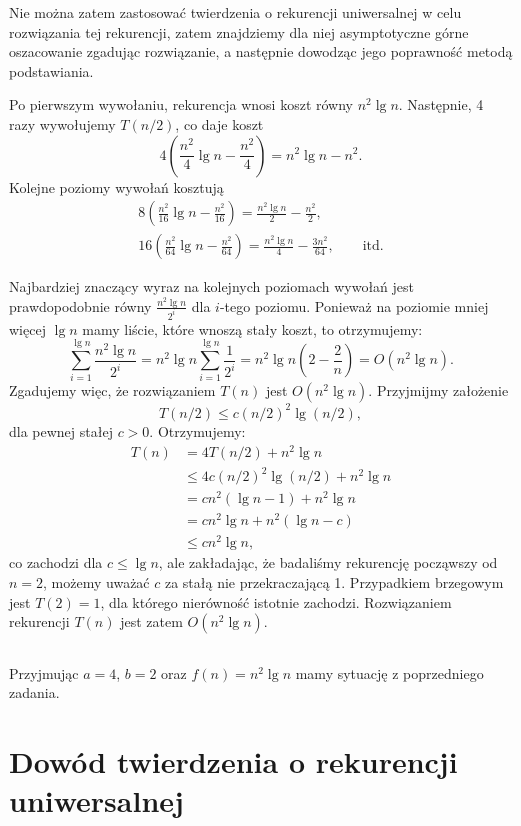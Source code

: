 Nie można zatem zastosować twierdzenia o rekurencji uniwersalnej w celu rozwiązania tej rekurencji, zatem znajdziemy dla niej asymptotyczne górne oszacowanie zgadując rozwiązanie, a następnie dowodząc jego poprawność metodą podstawiania.

Po pierwszym wywołaniu, rekurencja wnosi koszt równy $n^2\lg n$. Następnie, 4 razy wywołujemy $T(n/2)$, co daje koszt
\[
	4\left(\frac{n^2}{4}\lg n-\frac{n^2}{4}\right) = n^2\lg n-n^2.
\]
Kolejne poziomy wywołań kosztują
\begin{gather*}
	8\left(\frac{n^2}{16}\lg n-\frac{n^2}{16}\right) = \frac{n^2\lg n}{2}-\frac{n^2}{2}, \\
	16\left(\frac{n^2}{64}\lg n-\frac{n^2}{64}\right) = \frac{n^2\lg n}{4}-\frac{3n^2}{64},\qquad\text{itd.}
\end{gather*}

Najbardziej znaczący wyraz na kolejnych poziomach wywołań jest prawdopodobnie równy $\frac{n^2\lg n}{2^i}$ dla $i$-tego poziomu. Ponieważ na poziomie mniej więcej $\lg n$ mamy liście, które wnoszą stały koszt, to otrzymujemy:
\[
	\sum_{i=1}^{\lg n}\frac{n^2\lg n}{2^i} = n^2\lg n\sum_{i=1}^{\lg n}\frac{1}{2^i} = n^2\lg n\left(2-\frac{2}{n}\right) = O(n^2\lg n).
\]
Zgadujemy więc, że rozwiązaniem $T(n)$ jest $O(n^2\lg n)$. Przyjmijmy założenie
\[
	T(n/2) \le c(n/2)^2\lg(n/2),
\]
dla pewnej stałej $c>0$. Otrzymujemy:
\begin{align*}
	T(n) &= 4T(n/2)+n^2\lg n \\
	&\le 4c(n/2)^2\lg(n/2)+n^2\lg n \\
	&= cn^2(\lg n-1)+n^2\lg n \\
	&= cn^2\lg n+n^2(\lg n-c) \\
	&\le cn^2\lg n,
\end{align*}
co zachodzi dla $c\le\lg n$, ale zakładając, że badaliśmy rekurencję począwszy od $n=2$, możemy uważać $c$ za stałą nie przekraczającą 1. Przypadkiem brzegowym jest $T(2)=1$, dla którego nierówność istotnie zachodzi. Rozwiązaniem rekurencji $T(n)$ jest zatem $O(n^2\lg n)$.

\subsection{} %
Przyjmując $a=4$, $b=2$ oraz $f(n)=n^2\lg n$ mamy sytuację z poprzedniego zadania.

\section{Dowód twierdzenia o rekurencji uniwersalnej}

